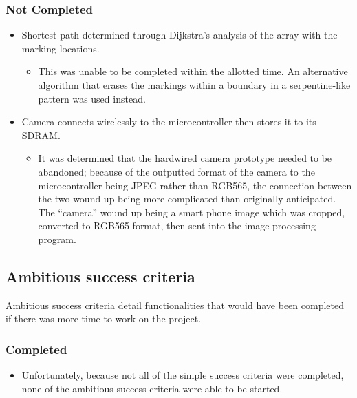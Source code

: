 \subsubsection{Not Completed}
\begin{itemize}
\item Shortest path determined through Dijkstra's analysis of the array with the marking locations.
	\begin{itemize}
	\item This was unable to be completed within the allotted time. An alternative algorithm that erases the markings within a boundary in a serpentine-like pattern was used instead.
	\end{itemize}
\item Camera connects wirelessly to the microcontroller then stores it to its SDRAM.
	\begin{itemize}
	\item It was determined that the hardwired camera prototype needed to be abandoned; because of the outputted format of the camera to the microcontroller being JPEG rather than RGB565, the connection between the two wound up being more complicated than originally anticipated. The ``camera'' wound up being a smart phone image which was cropped, converted to RGB565 format, then sent into the image processing program.
	\end{itemize}
\end{itemize}

\subsection{Ambitious success criteria}
Ambitious success criteria detail functionalities that would have been completed if there was more time to work on the project.\\
\subsubsection{Completed}
\begin{itemize}
	\item Unfortunately, because not all of the simple success criteria were completed, none of the ambitious success criteria were able to be started.\\
\end{itemize}
